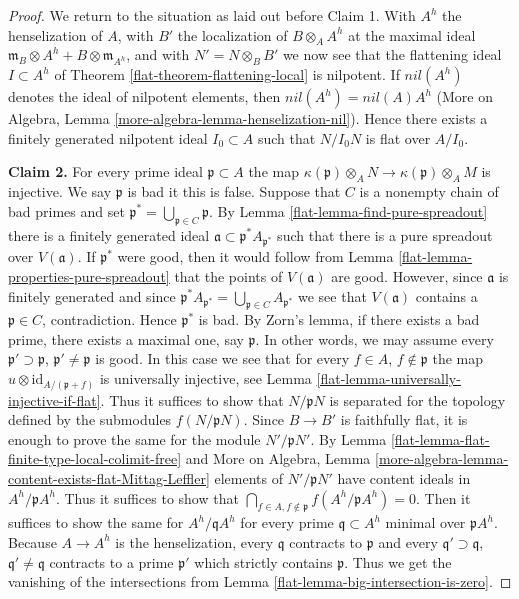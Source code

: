 \begin{proof}
\medskip\noindent
We return to the situation as laid out before Claim 1. With
$A^h$ the henselization of $A$, with $B'$ the localization
of $B \otimes_A A^h$ at the maximal ideal
$\mathfrak m_B \otimes A^h + B \otimes \mathfrak m_{A^h}$, and with
$N' = N \otimes_B B'$ we now see that the flattening ideal $I \subset A^h$
of Theorem \ref{flat-theorem-flattening-local} is nilpotent.
If $nil(A^h)$ denotes the ideal of nilpotent elements, then
$nil(A^h) = nil(A) A^h$
(More on Algebra, Lemma \ref{more-algebra-lemma-henselization-nil}).
Hence there exists a finitely generated
nilpotent ideal $I_0 \subset A$ such that $N/I_0N$ is flat over $A/I_0$.

\medskip\noindent
{\bf Claim 2.} For every prime ideal $\mathfrak p \subset A$
the map
$\kappa(\mathfrak p) \otimes_A N \to \kappa(\mathfrak p) \otimes_A M$
is injective. We say $\mathfrak p$ is bad it this is false.
Suppose that $C$ is a nonempty chain of bad primes and set
$\mathfrak p^* = \bigcup_{\mathfrak p \in C} \mathfrak p$.
By Lemma \ref{flat-lemma-find-pure-spreadout}
there is a finitely generated ideal
$\mathfrak a \subset \mathfrak p^*A_{\mathfrak p^*}$
such that there is a pure spreadout over $V(\mathfrak a)$.
If $\mathfrak p^*$ were good, then it would follow from
Lemma \ref{flat-lemma-properties-pure-spreadout}
that the points of $V(\mathfrak a)$ are good.
However, since $\mathfrak a$ is finitely generated and since
$\mathfrak p^*A_{\mathfrak p^*} = \bigcup_{\mathfrak p \in C}A_{\mathfrak p^*}$
we see that $V(\mathfrak a)$ contains a $\mathfrak p \in C$, contradiction.
Hence $\mathfrak p^*$ is bad. By Zorn's lemma, if there exists a
bad prime, there exists a maximal one, say $\mathfrak p$.
In other words, we may assume every $\mathfrak p' \supset \mathfrak p$,
$\mathfrak p' \not = \mathfrak p$ is good.
In this case we see that for every $f \in A$, $f \not \in \mathfrak p$
the map $u \otimes \text{id}_{A/(\mathfrak p + f)}$ is universally
injective, see Lemma \ref{flat-lemma-universally-injective-if-flat}.
Thus it suffices to show that $N/\mathfrak p N$ is separated
for the topology defined by the submodules $f(N/\mathfrak pN)$.
Since $B \to B'$ is faithfully flat, it is enough to prove the
same for the module $N'/\mathfrak p N'$.
By Lemma \ref{flat-lemma-flat-finite-type-local-colimit-free} and
More on Algebra, Lemma
\ref{more-algebra-lemma-content-exists-flat-Mittag-Leffler}
elements of $N'/\mathfrak pN'$ have content ideals in $A^h/\mathfrak pA^h$.
Thus it suffices to show that
$\bigcap_{f \in A, f \not \in \mathfrak p} f(A^h/\mathfrak p A^h) = 0$.
Then it suffices to show the same for
$A^h/\mathfrak q A^h$ for every prime $\mathfrak q \subset A^h$
minimal over $\mathfrak p A^h$. Because $A \to A^h$ is the henselization,
every $\mathfrak q$ contracts to $\mathfrak p$ and every
$\mathfrak q' \supset \mathfrak q$, $\mathfrak q' \not = \mathfrak q$
contracts to a prime $\mathfrak p'$ which strictly contains $\mathfrak p$.
Thus we get the vanishing of the intersections from
Lemma \ref{flat-lemma-big-intersection-is-zero}.


\end{proof}
